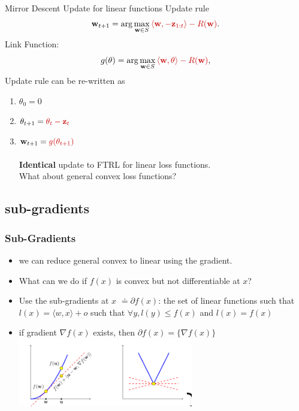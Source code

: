 \documentclass{beamer}
\begin{document}
\begin{small}
\begin{frame}{Mirror Descent Update for linear functions}
  Update rule
  \[
    \mathbf{w}_{t+1} = \arg\max_{\mathbf{w} \in S} \textcolor{mathcolor}{ \langle \mathbf{w}, -\mathbf{z}_{1:t} \rangle - R(\mathbf{w}) }.
  \]
Link Function:
\[
g(\theta) = \arg\max_{\mathbf{w} \in S} \textcolor{mathcolor}{ \langle \mathbf{w}, \theta \rangle - R(\mathbf{w}) },
\]
Update rule can be re-written as
\begin{enumerate}
  \item $\theta_0=0$
    \item \( \theta_{t+1} = \textcolor{mathcolor}{\theta_t - \mathbf{z}_t} \)
    \item \( \mathbf{w}_{t+1} = \textcolor{mathcolor}{g(\theta_{t+1})} \)\\
      ~\\ {\bf Identical} update to FTRL for linear loss functions.\\
      What about general convex loss functions?
    \end{enumerate}
    
\end{frame}

\subsection{sub-gradients}
\begin{frame}
  \frametitle{Sub-Gradients}
  \begin{itemize}
  \item we can reduce general convex to linear using the gradient.
  \item   What can we do if $f(x)$ is convex but not differentiable at $x$?
  \item Use the sub-gradients at $x$ $\doteq\partial f(x)$: the set of linear functions such that
    $l(x)=\langle w,x \rangle + o$ such that
    $\forall y, l(y) \leq f(x)$ and $l(x) = f(x)$
  \item if gradient $\nabla f(x)$ exists, then $\partial f(x) = \{\nabla f(x)\}$
    \includegraphics[width=0.6\textwidth]{figures/SubGradient.png}
  \end{itemize}
  

\end{frame}
\end{small}
\end{document}
